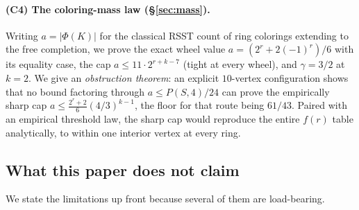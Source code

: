 \documentclass[11pt]{article}
\theoremstyle{definition}
\begin{document}
\paragraph{(C4) The coloring-mass law (\S\ref{sec:mass}).} Writing $a=|\Phi(K)|$ for
the classical RSST count of ring colorings extending to the free completion, we
prove the exact wheel value $a=(2^r+2(-1)^r)/6$ with its equality case, the cap
$a \le 11\cdot 2^{r+k-7}$ (tight at every wheel), and $\gamma=3/2$ at $k=2$. We
give an \emph{obstruction theorem}: an explicit $10$-vertex configuration shows that
no bound factoring through $a \le P(S,4)/24$ can prove the empirically sharp cap
$a \le \frac{2^r+2}{6}(4/3)^{k-1}$, the floor for that route being $61/43$. Paired
with an empirical threshold law, the sharp cap would reproduce the entire $f(r)$
table analytically, to within one interior vertex at every ring.

\subsection{What this paper does not claim}
\label{sec:notclaim}

We state the limitations up front because several of them are load-bearing.
\end{document}

